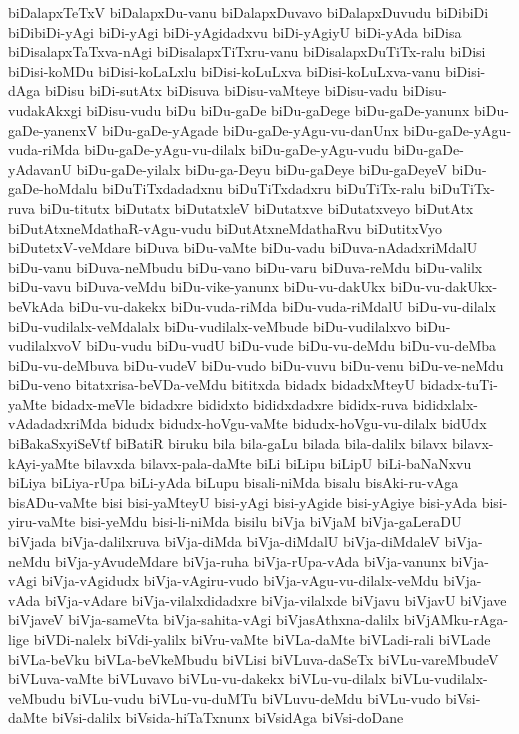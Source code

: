 {biDalapxTeTxV
biDalapxDu-vanu
biDalapxDuvavo
biDalapxDuvudu
biDibiDi
biDibiDi-yAgi
biDi-yAgi
biDi-yAgidadxvu
biDi-yAgiyU
biDi-yAda
biDisa
biDisalapxTaTxva-nAgi
biDisalapxTiTxru-vanu
biDisalapxDuTiTx-ralu
biDisi
biDisi-koMDu
biDisi-koLaLxlu
biDisi-koLuLxva
biDisi-koLuLxva-vanu
biDisi-dAga
biDisu
biDi-sutAtx
biDisuva
biDisu-vaMteye
biDisu-vadu
biDisu-vudakAkxgi
biDisu-vudu
biDu
biDu-gaDe
biDu-gaDege
biDu-gaDe-yanunx
biDu-gaDe-yanenxV
biDu-gaDe-yAgade
biDu-gaDe-yAgu-vu-danUnx
biDu-gaDe-yAgu-vuda-riMda
biDu-gaDe-yAgu-vu-dilalx
biDu-gaDe-yAgu-vudu
biDu-gaDe-yAdavanU
biDu-gaDe-yilalx
biDu-ga-Deyu
biDu-gaDeye
biDu-gaDeyeV
biDu-gaDe-hoMdalu
biDuTiTxdadadxnu
biDuTiTxdadxru
biDuTiTx-ralu
biDuTiTx-ruva
biDu-titutx
biDutatx
biDutatxleV
biDutatxve
biDutatxveyo
biDutAtx
biDutAtxneMdathaR-vAgu-vudu
biDutAtxneMdathaRvu
biDutitxVyo
biDutetxV-veMdare
biDuva
biDu-vaMte
biDu-vadu
biDuva-nAdadxriMdalU
biDu-vanu
biDuva-neMbudu
biDu-vano
biDu-varu
biDuva-reMdu
biDu-valilx
biDu-vavu
biDuva-veMdu
biDu-vike-yanunx
biDu-vu-dakUkx
biDu-vu-dakUkx-beVkAda
biDu-vu-dakekx
biDu-vuda-riMda
biDu-vuda-riMdalU
biDu-vu-dilalx
biDu-vudilalx-veMdalalx
biDu-vudilalx-veMbude
biDu-vudilalxvo
biDu-vudilalxvoV
biDu-vudu
biDu-vudU
biDu-vude
biDu-vu-deMdu
biDu-vu-deMba
biDu-vu-deMbuva
biDu-vudeV
biDu-vudo
biDu-vuvu
biDu-venu
biDu-ve-neMdu
biDu-veno
bitatxrisa-beVDa-veMdu
bititxda
bidadx
bidadxMteyU
bidadx-tuTi-yaMte
bidadx-meVle
bidadxre
bididxto
bididxdadxre
bididx-ruva
bididxlalx-vAdadadxriMda
bidudx
bidudx-hoVgu-vaMte
bidudx-hoVgu-vu-dilalx
bidUdx
biBakaSxyiSeVtf
biBatiR
biruku
bila
bila-gaLu
bilada
bila-dalilx
bilavx
bilavx-kAyi-yaMte
bilavxda
bilavx-pala-daMte
biLi
biLipu
biLipU
biLi-baNaNxvu
biLiya
biLiya-rUpa
biLi-yAda
biLupu
bisali-niMda
bisalu
bisAki-ru-vAga
bisADu-vaMte
bisi
bisi-yaMteyU
bisi-yAgi
bisi-yAgide
bisi-yAgiye
bisi-yAda
bisi-yiru-vaMte
bisi-yeMdu
bisi-li-niMda
bisilu
biVja
biVjaM
biVja-gaLeraDU
biVjada
biVja-dalilxruva
biVja-diMda
biVja-diMdalU
biVja-diMdaleV
biVja-neMdu
biVja-yAvudeMdare
biVja-ruha
biVja-rUpa-vAda
biVja-vanunx
biVja-vAgi
biVja-vAgidudx
biVja-vAgiru-vudo
biVja-vAgu-vu-dilalx-veMdu
biVja-vAda
biVja-vAdare
biVja-vilalxdidadxre
biVja-vilalxde
biVjavu
biVjavU
biVjave
biVjaveV
biVja-sameVta
biVja-sahita-vAgi
biVjasAthxna-dalilx
biVjAMku-rAga-lige
biVDi-nalelx
biVdi-yalilx
biVru-vaMte
biVLa-daMte
biVLadi-rali
biVLade
biVLa-beVku
biVLa-beVkeMbudu
biVLisi
biVLuva-daSeTx
biVLu-vareMbudeV
biVLuva-vaMte
biVLuvavo
biVLu-vu-dakekx
biVLu-vu-dilalx
biVLu-vudilalx-veMbudu
biVLu-vudu
biVLu-vu-duMTu
biVLuvu-deMdu
biVLu-vudo
biVsi-daMte
biVsi-dalilx
biVsida-hiTaTxnunx
biVsidAga
biVsi-doDane
}
